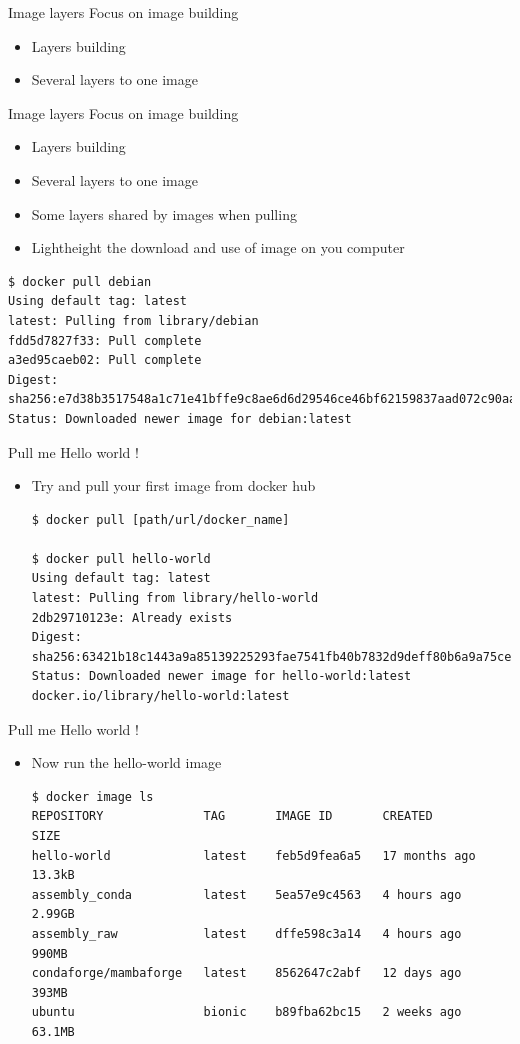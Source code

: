 \begin{frame}[fragile]{Image layers}
Focus on image building
\begin{itemize}[<+->]
\item Layers building
\item Several layers to one image
\end{itemize}
\end{frame}

\begin{frame}[fragile]{Image layers}
Focus on image building
\begin{itemize}
\item Layers building
\item Several layers to one image
\item Some layers shared by images when pulling
\item Lightheight the download and use of image on you computer
\end{itemize}
\begin{verbatim}
$ docker pull debian
Using default tag: latest
latest: Pulling from library/debian
fdd5d7827f33: Pull complete
a3ed95caeb02: Pull complete
Digest: sha256:e7d38b3517548a1c71e41bffe9c8ae6d6d29546ce46bf62159837aad072c90aa
Status: Downloaded newer image for debian:latest
\end{verbatim}
\end{frame}

\begin{frame}[fragile]{Pull me Hello world !}
\begin{itemize}
\item Try and pull your first image from docker hub
\begin{verbatim}
$ docker pull [path/url/docker_name]

$ docker pull hello-world
Using default tag: latest
latest: Pulling from library/hello-world
2db29710123e: Already exists 
Digest: sha256:63421b18c1443a9a85139225293fae7541fb40b7832d9deff80b6a9a75ce3604
Status: Downloaded newer image for hello-world:latest
docker.io/library/hello-world:latest

\end{verbatim}
\end{itemize}
\end{frame}

\begin{frame}[fragile]{Pull me Hello world !}
\begin{itemize}
\item Now run the hello-world image
\begin{verbatim}
$ docker image ls
REPOSITORY              TAG       IMAGE ID       CREATED         SIZE
hello-world             latest    feb5d9fea6a5   17 months ago   13.3kB
assembly_conda          latest    5ea57e9c4563   4 hours ago     2.99GB
assembly_raw            latest    dffe598c3a14   4 hours ago     990MB
condaforge/mambaforge   latest    8562647c2abf   12 days ago     393MB
ubuntu                  bionic    b89fba62bc15   2 weeks ago     63.1MB
\end{verbatim}
\end{itemize}
\end{frame}



